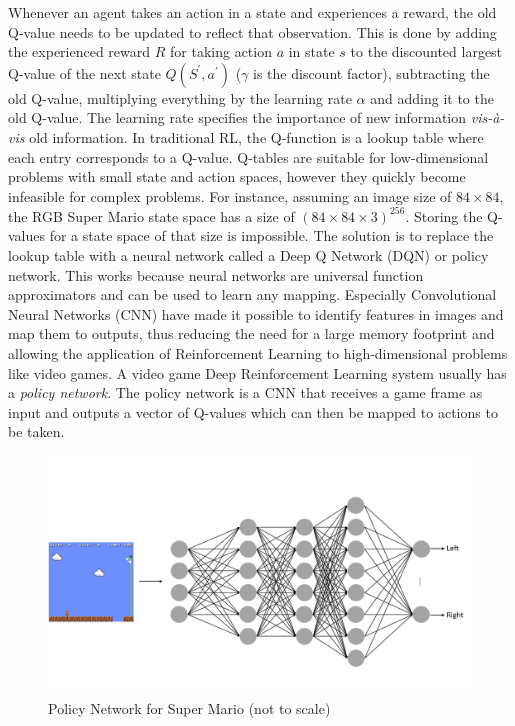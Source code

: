 \documentclass[notitlepage,a4paper,11pt]{article}
\begin{document}
Whenever an agent takes an action in a state and experiences a reward, the old Q-value needs to be updated to reflect that observation. This is done by adding the experienced reward $R$ for taking action $a$ in state $s$ to the discounted largest Q-value of the next state $Q(S^\prime, a^\prime)$ ($\gamma$ is the discount factor), subtracting the old Q-value, multiplying everything by the learning rate $\alpha$ and adding it to the old Q-value. The learning rate specifies the importance of new information \textit{vis-à-vis} old information. In traditional RL, the Q-function is a lookup table where each entry corresponds to a Q-value. Q-tables are suitable for low-dimensional problems with small state and action spaces, however they quickly become infeasible for complex problems. For instance, assuming an image size of $84 \times 84$, the RGB Super Mario state space has a size of $(84 \times 84 \times 3)^{256}$. Storing the Q-values for a state space of that size is impossible. The solution is to replace the lookup table with a neural network called a Deep Q Network (DQN) or policy network. This works because neural networks are universal function approximators and can be used to learn any mapping. Especially Convolutional Neural Networks (CNN) have made it possible to identify features in images and map them to outputs, thus reducing the need for a large memory footprint and allowing the application of Reinforcement Learning to high-dimensional problems like video games. A video game Deep Reinforcement Learning system usually has a \textit{policy network}. The policy network is a CNN that receives a game frame as input and outputs a vector of Q-values which can then be mapped to actions to be taken.

\begin{figure}[!htb]
\centering
\includegraphics[trim={0 2cm 0 2cm},clip,width=.75\linewidth]{figs/deep_rl_video_game.png}
\caption{Policy Network for Super Mario (not to scale)} \label{fig:2}
\end{figure}
\end{document}
